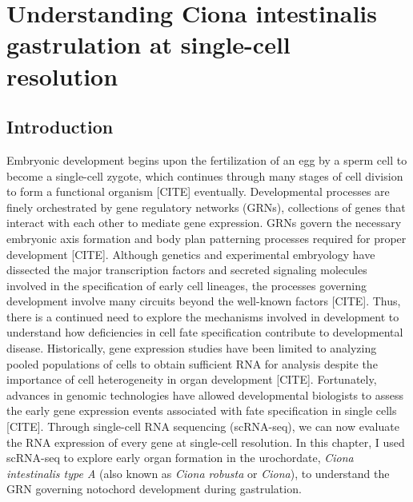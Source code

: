 \chapter{Understanding Ciona intestinalis gastrulation at single-cell resolution}

\section{Introduction}

Embryonic development begins upon the fertilization of an egg by a sperm cell to become a single-cell zygote, which continues through many stages of cell division to form a functional organism [CITE] eventually. Developmental processes are finely orchestrated by gene regulatory networks (GRNs), collections of genes that interact with each other to mediate gene expression. GRNs govern the necessary embryonic axis formation and body plan patterning processes required for proper development [CITE]. Although genetics and experimental embryology have dissected the major transcription factors and secreted signaling molecules involved in the specification of early cell lineages, the processes governing development involve many circuits beyond the well-known factors [CITE]. Thus, there is a continued need to explore the mechanisms involved in development to understand how deficiencies in cell fate specification contribute to developmental disease. Historically, gene expression studies have been limited to analyzing pooled populations of cells to obtain sufficient RNA for analysis despite the importance of cell heterogeneity in organ development [CITE]. Fortunately, advances in genomic technologies have allowed developmental biologists to assess the early gene expression events associated with fate specification in single cells [CITE]. Through single-cell RNA sequencing (scRNA-seq), we can now evaluate the RNA expression of every gene at single-cell resolution. In this chapter, I used scRNA-seq to explore early organ formation in the urochordate, \textit{Ciona intestinalis type A} (also known as \textit{Ciona robusta} or \textit{Ciona}), to understand the GRN governing notochord development during gastrulation.

